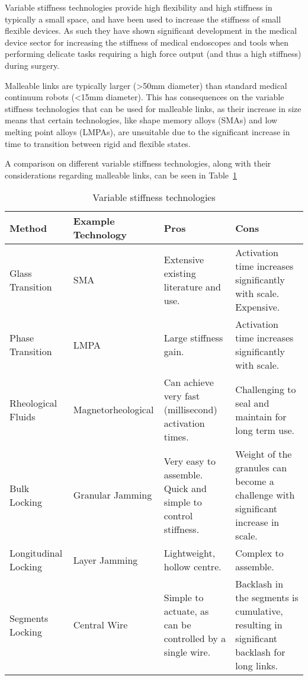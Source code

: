 Variable stiffness technologies provide high flexibility and high stiffness in typically a small space, and have been used to increase the stiffness of small flexible devices. As such they have shown significant development in the medical device sector for increasing the stiffness of medical endoscopes and tools when performing delicate tasks requiring a high force output (and thus a high stiffness) during surgery.

Malleable links are typically larger (>50mm diameter) than standard medical continuum robots (<15mm diameter). This has consequences on the variable stiffness technologies that can be used for malleable links, as their increase in size means that certain technologies, like shape memory alloys (SMAs) and low melting point alloys (LMPAs), are unsuitable due to the significant increase in time to transition between rigid and flexible states.

A comparison on different variable stiffness technologies, along with their considerations regarding malleable links, can be seen in Table~\ref{tab:variable_stiffness}

\begin{table}[!t]
    \small
    \centering
    \begin{tabular}{p{17mm}p{2cm}p{3cm}p{3cm}}
         \textbf{Method} & \textbf{Example Technology} & \textbf{Pros} & \textbf{Cons} \\
         \hline
         Glass Transition & SMA & Extensive existing literature and use. & Activation time increases significantly with scale. Expensive.\\
         Phase Transition & LMPA & Large stiffness gain. & Activation time increases significantly with scale. \\
         Rheological Fluids & Magnetorheological & Can achieve very fast (millisecond) activation times. & Challenging to seal and maintain for long term use.\\
         Bulk Locking & Granular Jamming & Very easy to assemble. Quick and simple to control stiffness. & Weight of the granules can become a challenge with significant increase in scale.\\
         Longitudinal Locking & Layer Jamming & Lightweight, hollow centre. & Complex to assemble.\\
         Segments Locking & Central Wire & Simple to actuate, as can be controlled by a single wire. & Backlash in the segments is cumulative, resulting in significant backlash for long links. \\
         \hline
    \end{tabular}
    \caption{Variable stiffness technologies}
    \label{tab:variable_stiffness}
\end{table}

